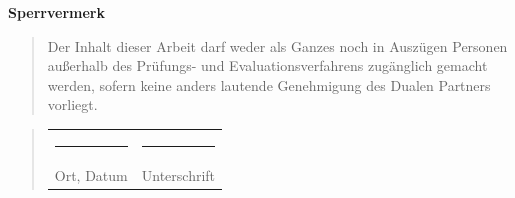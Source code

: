\begin{titlepage}
	\begin{center}
		\vspace*{1cm}
		\Huge\bf Sperrvermerk\\
		\vspace*{2cm}
		\large\rm
		
		\begin{quotation}
			\hspace*{-1.75em}
			\parbox{0.85\textwidth}{\singlespacing Der Inhalt dieser Arbeit darf weder als Ganzes noch in Auszügen Personen außerhalb des Prüfungs- und Evaluationsverfahrens zugänglich gemacht werden, sofern keine anders lautende Genehmigung des Dualen Partners vorliegt.}
		\end{quotation}
		\vspace*{0.5cm}
		\begin{quotation}
			\hspace*{-1.5em}
			\parbox{0.85\textwidth}{
				\singlespacing
				\begin{tabularx}{0.83\textwidth}{l@{\extracolsep\fill}l}
					\rule{4cm}{0.3mm}&\rule{4cm}{0.3mm}\\
					\large
					Ort, Datum&\large Unterschrift
				\end{tabularx}}
			\end{quotation}
		\end{center}
	\end{titlepage}
	\newpage
	\setcounter{page}{3}
